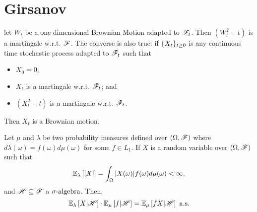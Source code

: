 \documentclass[../TGMAFFIRO.tex]{subfiles}
\begin{document}
\section{Girsanov}
\begin{theorem}\label{th:levy_brownian motion}
	let $W_t$ be a one dimensional Brownian Motion adapted to $\mathscr{F}_t$. Then $(W_t^2 - t)$ is a martingale w.r.t. $\mathscr{F}$.
	The converse is also true: if $\{X_t\}_{t\geq 0}$ is any continuous time stochastic process adapted to $\mathscr{F}_t$ such that
	\begin{itemize}
		\item $X_0 = 0$;
		\item $X_t$ is a martingale w.r.t. $\mathscr{F}_t$; and
		\item $(X_t^2 - t)$ is a martingale w.r.t. $\mathscr{F}_t$.
	\end{itemize}
	
	Then $X_t$ is a Brownian motion.
\end{theorem}

\begin{proposition}\label{prop:expectation_two_measures}
	Let $\mu$ and $\lambda$ be two probability measures defined over $(\Omega, \mathscr{F})$ where $d\lambda(\omega) = f(\omega)d\mu(\omega)$ for some $f\in L_1$. If $X$ is a random variable over $(\Omega, \mathscr{F})$ such that
	\begin{equation}
		\mathbb{E}_{\lambda}\left[|X|\right] = \int_\Omega |X(\omega)| f(\omega) d\mu(\omega) < \infty,
	\end{equation}
	and $\mathscr{H}\subseteq\mathscr{F}$ a $\sigma\text{-algebra}$. Then,
	\begin{equation}
	  \mathbb{E}_{\lambda}\left[X|\mathscr{H}\right] \cdot \mathbb{E}_{\mu}\left[f|\mathscr{H}\right] = \mathbb{E}_{\mu}\left[fX|\mathscr H\right] \text{ a.s.}
	\end{equation}
\end{proposition}
\end{document}
